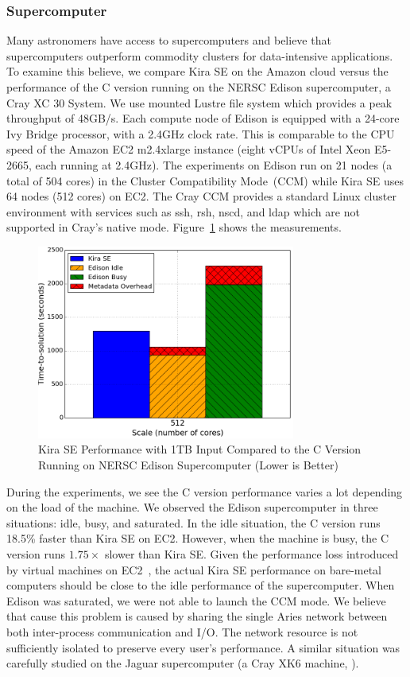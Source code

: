 \documentclass[10pt, conference, compsocconf]{IEEEtran}
\newcommand{\up}{\vspace*{-1em}}
\begin{document}
\subsubsection{Supercomputer}

Many astronomers have access to supercomputers and believe that
supercomputers outperform commodity clusters for data-intensive applications.
To examine this believe, we compare Kira SE on the Amazon cloud versus the performance of
the C version running on the NERSC Edison supercomputer, a Cray XC 30 System. We use
mounted Lustre file system which provides a peak throughput of 48GB/s. Each compute
node of Edison is equipped with a 24-core Ivy Bridge processor, with a 2.4GHz clock rate.
This is comparable to the CPU speed of the Amazon EC2 m2.4xlarge instance (eight vCPUs of
Intel Xeon E5-2665, each running at 2.4GHz). The experiments on Edison run on 21
nodes (a total of 504 cores) in the Cluster Compatibility Mode~(CCM)
while Kira SE uses 64 nodes (512 cores) on EC2. The Cray CCM provides a 
standard Linux cluster environment with services such as ssh, rsh, nscd, and ldap which 
are not supported in Cray's native mode.
Figure~\ref{fig:1tb-edison} shows the measurements.

\begin{figure}[h]
	\begin{center}
		\includegraphics[width=85mm]{pictures/1TB-edison}
		\caption{Kira SE Performance with 1TB Input Compared to the C Version Running on NERSC Edison Supercomputer (Lower is Better)
		\label{fig:1tb-edison}}
		\up
  	\end{center}
\end{figure}

During the experiments, we see the C version performance varies a lot depending on the
load of the machine. We observed the Edison supercomputer in three situations: idle, busy,
and saturated. In the idle situation, the C version runs 18.5\% faster than Kira SE on EC2. 
However, when the machine is busy, the C version runs $1.75\times$ slower than Kira SE. 
Given the performance loss introduced by virtual machines on EC2~\cite{li13},
the actual Kira SE performance on bare-metal computers should be close to the idle performance
of the supercomputer. When Edison was saturated, we were not able to launch the CCM mode.
We believe that cause this problem is caused by sharing the single Aries network between both inter-process
communication and I/O. The network resource is not sufficiently isolated to preserve every
user's performance. A similar situation was carefully studied on the Jaguar supercomputer
(a Cray XK6 machine, \cite{xie12}).
\end{document}
